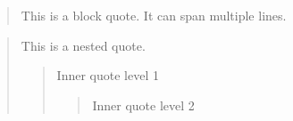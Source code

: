 \documentclass{article}
\begin{document}
\begin{quote}
This is a block quote.
It can span multiple lines.
\end{quote}

\begin{quote}
This is a nested quote.
\begin{quote}
Inner quote level 1
\begin{quote}
Inner quote level 2
\end{quote}
\end{quote}
\end{quote}
\end{document}
